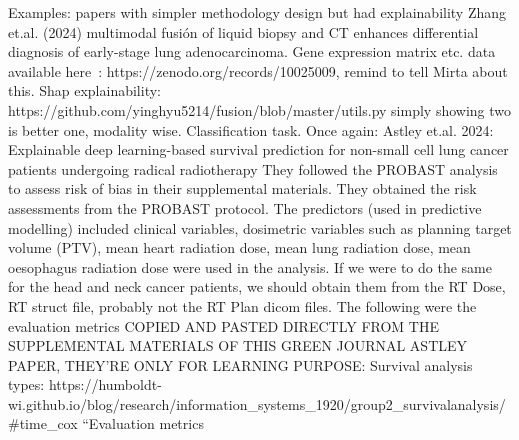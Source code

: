\documentclass{article}%
\begin{document}
%
Examples: papers with simpler methodology design but had explainability %
\newline%
\newline%
%
Zhang et.al. (2024) multimodal fusión of liquid biopsy and CT enhances differential diagnosis of early{-}stage lung adenocarcinoma. %
\newline%
\newline%
%
Gene expression matrix etc. data available here~: https://zenodo.org/records/10025009, remind to tell Mirta about this. %
\newline%
\newline%
%
Shap explainability: https://github.com/yinghyu5214/fusion/blob/master/utils.py %
\newline%
\newline%
%
simply showing two is better one, modality wise. Classification task. %
\newline%
\newline%
%
Once again: Astley et.al. 2024: Explainable deep learning{-}based survival prediction for non{-}small cell lung cancer patients undergoing radical radiotherapy %
\newline%
\newline%
%
They followed the PROBAST analysis to assess risk of bias in their supplemental materials.%
\newline%
\newline%
%
They obtained the risk assessments from the PROBAST protocol. The predictors (used in predictive modelling) included clinical variables, dosimetric variables such as planning target volume (PTV), mean heart radiation dose, mean lung radiation dose, mean oesophagus radiation dose were used in the analysis. If we were to do the same for the head and neck cancer patients, we should obtain them from the RT Dose, RT struct file, probably not the RT Plan dicom files. %
\newline%
\newline%
%
The following were the evaluation metrics COPIED AND PASTED DIRECTLY FROM THE SUPPLEMENTAL MATERIALS OF THIS GREEN JOURNAL ASTLEY PAPER, THEY’RE ONLY FOR LEARNING PURPOSE: %
\newline%
\newline%
%
Survival analysis types: https://humboldt{-}wi.github.io/blog/research/information\_systems\_1920/group2\_survivalanalysis/\#time\_cox %
\newline%
\newline%
%
“Evaluation metrics%
\newline%
\end{document}
